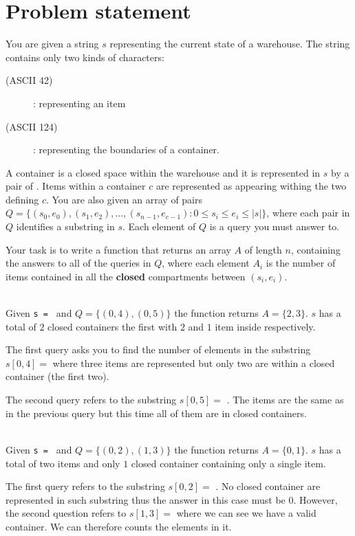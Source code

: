\section{Problem statement}
\begin{exercise}
	You are given a string $s$ representing the current state of a warehouse. The string contains
	only two kinds of characters: 
	\begin{description}
		\item[\bsq{\textbf{\texttt{*}}}(ASCII 42)]: representing an item 
		\item[\bsq{\textbf{\texttt{|}}}(ASCII 124)]: representing the boundaries of a container.
	\end{description}
	
	A container is a closed space within the warehouse and it is represented in $s$ by a pair of
	\bsq{\texttt{|}}. Items within a container $c$ are represented as \bsq{\texttt{*}} appearing
	withing the two \bsq{\texttt{|}} defining $c$. You are also given an array of pairs $Q = \{(s_0,
	e_0),(s_1, e_2),\ldots,(s_{n-1}, e_{e-1}) : 0 \leq s_i \leq e_i \leq |s|\}$, where each pair in
	$Q$ identifies a substring in $s$. Each element of $Q$ is a query you must answer to.
	
	Your task is to write a function that returns an array $A$ of length $n$, containing the answers
	to all of the queries in $Q$, where each element $A_i$ is the number of items contained in all
	the \textbf{closed} compartments between $(s_i, e_i)$.	

\begin{example}
	\hfill \\
	Given \texttt{s = \bsq{|**|*|*}} and $Q = \{(0,4),(0,5)\}$ the function returns $A=\{2,3\}$. $s$
	has a total of $2$ closed containers the first with $2$ and $1$ item inside respectively.
	
	The first query asks you to find the number of elements in the substring $s[0,4]=$
	\texttt{\bsq{|**|*}} where three items are represented but only two are within a closed
	container (the first two).
	
	The second query refers to the substring $s[0,5]=$ \texttt{\bsq{|**|*|}}. The items are the same
	as in the previous query but this time all of them are in closed containers.
	
\end{example}

\begin{example}
	\hfill \\
	Given \texttt{s = \bsq{*|*|}} and $Q = \{(0,2),(1,3)\}$ the function returns $A=\{0,1\}$. $s$
	has a total of two items and only $1$ closed container containing only a single item.

	The first query refers to the substring $s[0,2]=$ \texttt{\bsq{*|*}}. No closed container are
	represented in such substring thus the answer in this case must be $0$. However, the second
	question refers to  $s[1,3]=$ \texttt{\bsq{|*|}} where we can see we have a valid container. We
	can therefore counts the elements in it.
\end{example}

\end{exercise}
